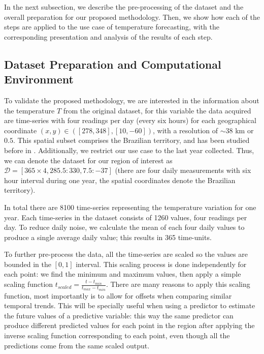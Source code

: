 In the next subsection, we describe the pre-processing of the dataset and the overall preparation for our proposed methodology. Then, we show how each of the steps are applied to the use case of temperature forecasting, with the corresponding presentation and analysis of the results of each step.

\subsection{Dataset Preparation and Computational Environment}
\label{sec:DatasetPreparation}

To validate the proposed methodology, we are interested in the information about the temperature $T$ from the original dataset, for this variable the data acquired are time-series with four readings per day (every six hours) for each geographical coordinate $(x,y)\in ([278, 348], [10, -60])$, with a resolution of $\sim 38$ km or $0.5$\textdegree. This spatial subset comprises the Brazilian territory, and has been studied before in \cite{Souto2018}. Additionally, we restrict our use case to the last year collected. Thus, we can denote the dataset for our region of interest as $\mathcal{D} = [ 365\times 4, 285.5:330, 7.5:-37]$ (there are four daily measurements with six hour interval during one year, the spatial coordinates denote the Brazilian territory). 


In total there are 8100 time-series representing the temperature variation for one year. Each time-series in the dataset consists of 1260 values, four readings per day. To reduce daily noise, we calculate the mean of each four daily values to produce a single average daily value; this results in 365 time-units. 

To further pre-process the data, all the time-series are scaled so the values are bounded in the $[0, 1]$ interval. This scaling process is done independently for each point: we find the minimum and maximum values, then apply a simple scaling function $ t_{scaled} = \frac{t - t_{min}}{t_{max} - t_{min}}$. There are many reasons to apply this scaling function, most importantly is to allow for offsets when comparing similar temporal trends. This will be specially useful when using a predictor to estimate the future values of a predictive variable: this way the same predictor can produce different predicted values for each point in the region after applying the inverse scaling function corresponding to each point, even though all the predictions come from the same scaled output.

